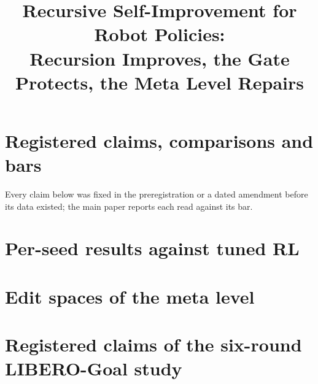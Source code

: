 \documentclass[10pt,twocolumn,letterpaper]{article}
\title{Recursive Self-Improvement for Robot Policies:\\Recursion Improves, the Gate Protects, the Meta Level Repairs}
\begin{document}
\maketitlesupplementary
\section{Registered claims, comparisons and bars}
Every claim below was fixed in the preregistration or a dated amendment before its data existed; the main paper reports each read against its bar.

\section{Per-seed results against tuned RL}

\section{Edit spaces of the meta level}

\section{Registered claims of the six-round LIBERO-Goal study}

\end{document}
